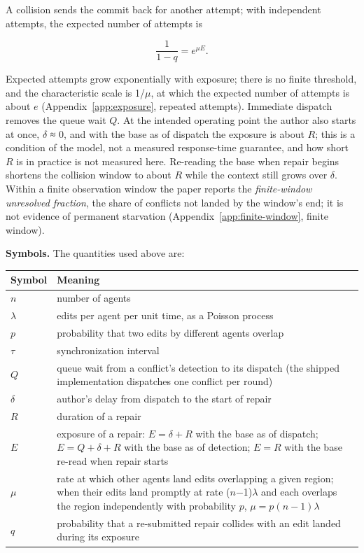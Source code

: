 \documentclass[pdflatex,sn-mathphys-ay]{sn-jnl}
\theoremstyle{thmstyleone}
\theoremstyle{thmstylethree}
\begin{document}
A collision sends the commit back for another attempt; with independent attempts, the expected number of attempts is

\[
\frac{1}{1-q} = e^{\mu E} .
\]

Expected attempts grow exponentially with exposure; there is no finite threshold, and the characteristic scale is 1/\(\mu\), at which the expected number of attempts is about \(e\) (Appendix~\ref{app:exposure}, repeated attempts). Immediate dispatch removes the queue wait \(Q\). At the intended operating point the author also starts at once, \(\delta\) ≈ 0, and with the base as of dispatch the exposure is about \(R\); this is a condition of the model, not a measured response-time guarantee, and how short \(R\) is in practice is not measured here. Re-reading the base when repair begins shortens the collision window to about \(R\) while the context still grows over \(\delta\). Within a finite observation window the paper reports the \emph{finite-window unresolved fraction}, the share of conflicts not landed by the window's end; it is not evidence of permanent starvation (Appendix~\ref{app:finite-window}, finite window).

\textbf{Symbols.} The quantities used above are:

\begin{center}
\centering\small
\setlength{\tabcolsep}{4pt}
\renewcommand{\arraystretch}{1.12}
\begin{tabularx}{\textwidth}{@{}l>{\raggedright\arraybackslash}X@{}}
\toprule
Symbol & Meaning \\
\midrule
\(n\) & number of agents \\
\addlinespace[3pt]
\(\lambda\) & edits per agent per unit time, as a Poisson process \\
\addlinespace[3pt]
\(p\) & probability that two edits by different agents overlap \\
\addlinespace[3pt]
\(\tau\) & synchronization interval \\
\addlinespace[3pt]
\(Q\) & queue wait from a conflict's detection to its dispatch (the shipped implementation dispatches one conflict per round) \\
\addlinespace[3pt]
\(\delta\) & author's delay from dispatch to the start of repair \\
\addlinespace[3pt]
\(R\) & duration of a repair \\
\addlinespace[3pt]
\(E\) & exposure of a repair: \(E = \delta  + R\) with the base as of dispatch; \(E = Q + \delta  + R\) with the base as of detection; \(E = R\) with the base re-read when repair starts \\
\addlinespace[3pt]
\(\mu\) & rate at which other agents land edits overlapping a given region; when their edits land promptly at rate (\(n\)−1)\(\lambda\) and each overlaps the region independently with probability \(p\), \(\mu  = p(n-1)\lambda\) \\
\addlinespace[3pt]
\(q\) & probability that a re-submitted repair collides with an edit landed during its exposure \\
\bottomrule
\end{tabularx}
\end{center}
\end{document}
